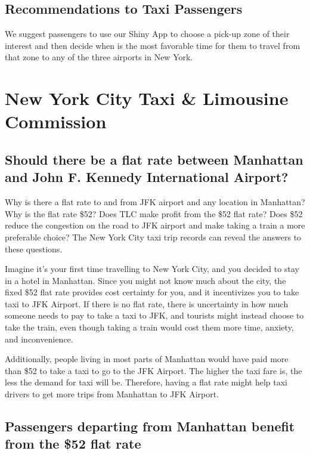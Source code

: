 \documentclass[12pt,twoside]{reedthesis}
\theoremstyle{definition}
\theoremstyle{definition}
\theoremstyle{definition}
\theoremstyle{remark}
\begin{document}
\section{Recommendations to Taxi
Passengers}\label{recommendations-to-taxi-passengers}

We suggest passengers to use our Shiny App to choose a pick-up zone of
their interest and then decide when is the most favorable time for them
to travel from that zone to any of the three airports in New York.

\chapter{New York City Taxi \& Limousine Commission}\label{chapter5}

\section{Should there be a flat rate between Manhattan and John F.
Kennedy International
Airport?}\label{should-there-be-a-flat-rate-between-manhattan-and-john-f.-kennedy-international-airport}

Why is there a flat rate to and from JFK airport and any location in
Manhattan? Why is the flat rate \$52? Does TLC make profit from the \$52
flat rate? Does \$52 reduce the congestion on the road to JFK airport
and make taking a train a more preferable choice? The New York City taxi
trip records can reveal the answers to these questions.

Imagine it's your first time travelling to New York City, and you
decided to stay in a hotel in Manhattan. Since you might not know much
about the city, the fixed \$52 flat rate provides cost certainty for
you, and it incentivizes you to take taxi to JFK Airport. If there is no
flat rate, there is uncertainty in how much someone needs to pay to take
a taxi to JFK, and tourists might instead choose to take the train, even
though taking a train would cost them more time, anxiety, and
inconvenience.

Additionally, people living in most parts of Manhattan would have paid
more than \$52 to take a taxi to go to the JFK Airport. The higher the
taxi fare is, the less the demand for taxi will be. Therefore, having a
flat rate might help taxi drivers to get more trips from Manhattan to
JFK Airport.

\section{Passengers departing from Manhattan benefit from the \$52 flat
rate}\label{passengers-departing-from-manhattan-benefit-from-the-52-flat-rate}
\end{document}
